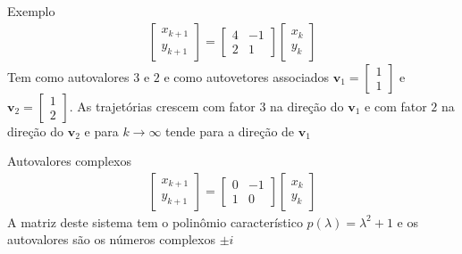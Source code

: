 \documentclass{beamer}
\begin{document}
\begin{frame}{Exemplo}
  \begin{gather*}
    \begin{bmatrix}
      x_{k+1} \\ y_{k+1} 
    \end{bmatrix} = \begin{bmatrix}
      4& -1 \\ 2 & 1
    \end{bmatrix}\begin{bmatrix}
      x_k \\ y_k
    \end{bmatrix}
  \end{gather*}
  Tem como autovalores $3$ e $2$ e como autovetores associados 
  $\mathbf{v}_1=\begin{bmatrix}
    1 \\ 1
  \end{bmatrix}$ e $\mathbf{v}_2=\begin{bmatrix}
    1 \\ 2
  \end{bmatrix}.$ As trajetórias crescem com fator $3$ na direção do 
  $\mathbf{v}_1$ e com fator $2$ na direção do $\mathbf{v}_2$ e para 
  $k \to \infty$ tende para a direção de $\mathbf{v}_1$
\end{frame}

\begin{frame}{Autovalores complexos}
  \begin{gather*}
    \begin{bmatrix}
      x_{k+1} \\ y_{k+1} 
    \end{bmatrix} = \begin{bmatrix}
      0& -1\\ 1 & 0
    \end{bmatrix}\begin{bmatrix}
      x_k \\ y_k
    \end{bmatrix}
  \end{gather*}
  A matriz deste sistema tem o polinômio característico 
  $p(\lambda)= \lambda^2 + 1$ e os autovalores são os números
  complexos $\pm i$
  
\end{frame}
\end{document}
